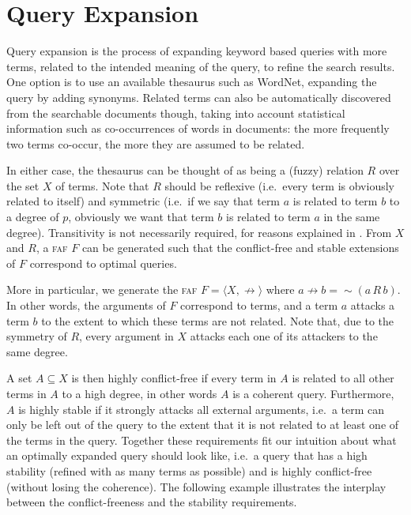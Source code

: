 \documentclass[12pt,a4paper]{article}
\newcommand{\abfaf}{\textsc{faf}}
\newcommand{\attack}{\ensuremath{\not\rightarrow}}
\newcommand{\af}[2]{\ensuremath{\langle{#1},{#2}\rangle}}
\newcommand{\fneg}{\ensuremath{\sim}}
\begin{document}
\section{Query Expansion}\label{sec-appl}
Query expansion is the process of expanding keyword based queries with
more terms, related to the intended meaning of the query, to refine
the search results. One option is to use an available thesaurus such
as WordNet, expanding the query by adding synonyms\cite{voorhees94}.
Related terms can also be automatically discovered from the searchable documents though, 
taking into account statistical information such as co-occurrences of words
in documents: the more frequently two terms co-occur, 
the more they are assumed to be related\cite{Xu96}.


In either case, the thesaurus can be thought of as being a (fuzzy) relation $R$ over the set $X$ of terms. Note that $R$ should be reflexive (i.e.~every term is obviously related to itself) and symmetric (i.e.~if we say that term $a$ is related to term $b$ to a degree of $p$, obviously we want that term $b$ is related to term $a$ in the same degree). Transitivity is not necessarily required, for reasons explained in \cite{FuzzyRoughSets2}.  
From $X$ and $R$, a \abfaf{} $F$ can be generated such that the conflict-free and stable extensions of $F$ correspond to optimal queries.  

More in particular, we generate the \abfaf{} $F = \af{X}{\attack}$ where $a \attack b = \fneg (a\,R\,b)$. In other words, the arguments of $F$ correspond to terms, and a term $a$ attacks a term $b$ to the extent to which these terms are not related. Note that, due to the symmetry of $R$, every argument in $X$ attacks each one of its attackers to the same degree. 

A set $A \subseteq X$ is then highly conflict-free if every term in $A$ is related to all other terms in $A$ to a high degree, in other words $A$ is a coherent query. Furthermore, $A$ is highly stable if it strongly attacks all external arguments, i.e.~a term can only be left out of the query to the extent that it is not related to at least one of the terms in the query. 
Together these requirements fit our intuition about what an optimally expanded query should look like, i.e.~a query that has a high stability (refined with as many terms as possible) and is highly conflict-free (without losing the coherence). The following example illustrates the interplay between the conflict-freeness and the stability requirements.
\end{document}
